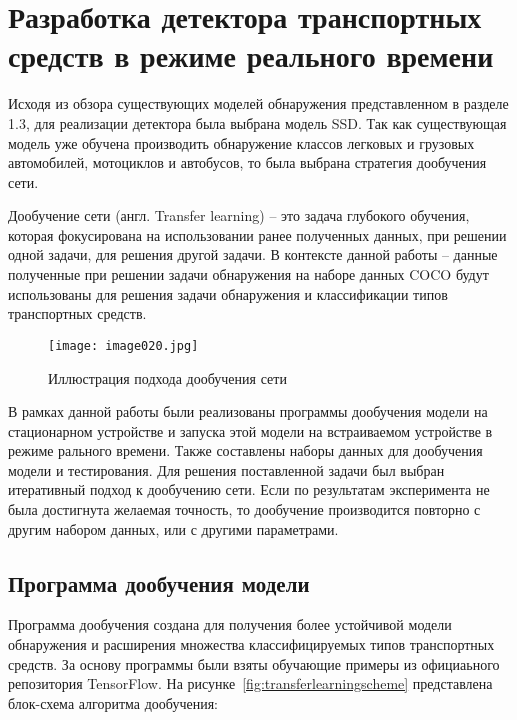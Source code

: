 \chapter{Разработка детектора транспортных средств в режиме реального времени}

Исходя из обзора существующих моделей обнаружения представленном в разделе 1.3, для реализации детектора была выбрана модель SSD. Так как существующая модель уже обучена производить обнаружение классов легковых и грузовых автомобилей, мотоциклов и автобусов, то была выбрана стратегия дообучения сети. 

Дообучение сети (англ. Transfer learning) – это задача глубокого обучения, которая фокусирована на использовании ранее полученных данных, при решении одной задачи, для решения другой задачи. В контексте данной работы – данные полученные при решении задачи обнаружения на наборе данных COCO будут использованы для решения задачи обнаружения и классификации типов транспортных средств.

\begin{figure}[htbp]
\centering
\texttt{[image: image020.jpg]}
\caption{Иллюстрация подхода дообучения сети}%
\label{fig:how-to-do-research}
\end{figure}

В рамках данной работы были реализованы программы дообучения модели на стационарном устройстве и запуска этой модели на встраиваемом устройстве в режиме рального времени. Также составлены наборы данных для дообучения модели и тестирования. Для решения поставленной задачи был выбран итеративный подход к дообучению сети. Если по результатам эксперимента не была достигнута желаемая точность, то дообучение производится повторно с другим набором данных, или с другими параметрами. 

\section{Программа дообучения модели}

Программа дообучения создана для получения более устойчивой модели обнаружения и расширения множества классифицируемых типов транспортных средств. За основу программы были взяты обучающие примеры из официаьного репозитория TensorFlow\cite{seventeen}. На рисунке~\ref{fig:transferlearningscheme} представлена блок-схема алгоритма дообучения:

